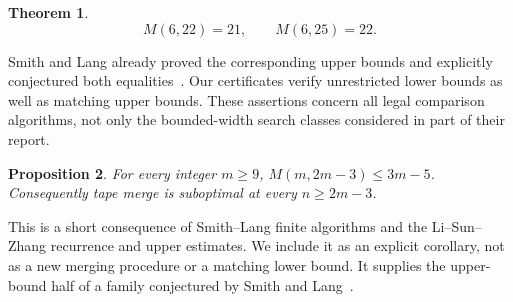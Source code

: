 \documentclass[11pt]{article}
\newtheorem{theorem}{Theorem}[section]
\newtheorem{proposition}[theorem]{Proposition}
\theoremstyle{definition}
\theoremstyle{remark}
\begin{document}
\begin{theorem}\label{thm:exact}
\[M(6,22)=21,\qquad M(6,25)=22.\]
\end{theorem}
Smith and Lang already proved the corresponding upper bounds and explicitly
conjectured both equalities~\cite[Sections~3.12 and~4.3]{smithlang}.
Our certificates verify unrestricted lower bounds as well as matching
upper bounds. These assertions concern all legal comparison algorithms,
not only the bounded-width search classes considered in part of their
report.

\begin{proposition}\label{prop:uppermain}
For every integer $m\ge9$, $M(m,2m-3)\le3m-5$.
Consequently tape merge is suboptimal at every $n\ge2m-3$.
\end{proposition}
This is a short consequence of Smith--Lang finite algorithms and the
Li--Sun--Zhang recurrence and upper estimates. We include it as an
explicit corollary, not as a new merging procedure or a matching lower
bound. It supplies the upper-bound half of a family conjectured by Smith
and Lang~\cite[Section~5.1]{smithlang}.
\end{document}
